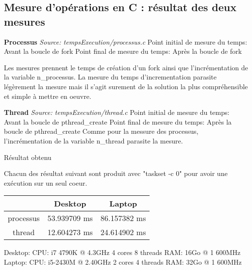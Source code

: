\documentclass[12pt]{article}
\begin{document}
	\subsection{Mesure d'opérations en C : résultat des deux mesures}

		\textbf{Processus}\newline
		\textit{Source: tempsExecution/processus.c} \newline
		Point initial de mesure du temps: Avant la boucle de fork \newline
		Point final de mesure du temps: Après la boucle de fork \newline
		\newline

		Les mesures prennent le temps de création d'un fork ainsi que l'incrémentation
		de la variable n\_processus. La mesure du temps d'incrementation parasite
		légèrement la mesure mais il s'agit surement de la solution la plus
		compréhensible et simple à mettre en oeuvre.\newline
		\newline

		\textbf{Thread}\newline
		\textit{Source: tempsExecution/thread.c}\newline
		Point initial de mesure du temps: Avant la boucle de pthread\_create\newline
		Point final de mesure du temps: Après la boucle de pthread\_create\newline
		\newline
		Comme pour la messure des processus, l'incrémentation de la variable
		n\_thread parasite la mesure.\newline

		Résultat obtenu

		Chacun des résultat suivant sont produit avec "taskset -c 0" pour avoir
		une exécution sur un seul coeur.

		\begin{center}
		  \begin{tabular}{ | c | c | c | }
				\hline
					&	Desktop      &    Laptop \\
				\hline
					processus & 53.939709 ms  &     86.157382 ms \\
				\hline
					thread    & 12.604273 ms  &      24.614902 ms \\
				\hline
			\end{tabular}
		\end{center}

		Desktop: CPU: i7 4790K @ 4.3GHz 4 cores 8 threads RAM: 16Go @ 1 600MHz
		Laptop: CPU: i5-2430M @ 2.40GHz 2 cores 4 threads RAM: 32Go @ 1 600MHz
\end{document}
